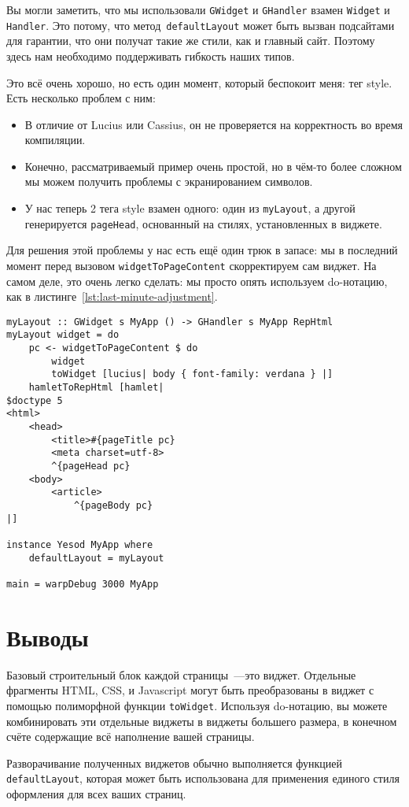 \begin{remark}
    Вы могли заметить, что мы использовали \lstinline'GWidget' и
    \lstinline'GHandler' взамен \lstinline'Widget' и \lstinline'Handler'. Это
    потому, что метод~\lstinline'defaultLayout' может быть вызван подсайтами
    для гарантии, что они получат такие же стили, как и главный сайт. Поэтому
    здесь нам необходимо поддерживать гибкость наших типов.
\end{remark}

Это всё очень хорошо, но есть один момент, который беспокоит меня: тег style.
Есть несколько проблем с ним:
\begin{itemize}
    \item В отличие от Lucius или Cassius, он не проверяется на корректность во
        время компиляции.

    \item Конечно, рассматриваемый пример очень простой, но в чём-то более
        сложном мы можем получить проблемы с экранированием символов.

    \item У нас теперь 2 тега style взамен одного: один из
        \lstinline'myLayout', а другой генерируется \lstinline'pageHead',
        основанный на стилях, установленных в виджете.
\end{itemize}

Для решения этой проблемы у нас есть ещё один трюк в запасе: мы в последний
момент перед вызовом \lstinline'widgetToPageContent' скорректируем сам виджет.
На самом деле, это очень легко сделать: мы просто опять используем do-нотацию,
как в листинге~\ref{lst:last-minute-adjustment}.
\begin{lstlisting}[caption={Корректировка виджета <<в последний момент>>},label={lst:last-minute-adjustment}]
myLayout :: GWidget s MyApp () -> GHandler s MyApp RepHtml
myLayout widget = do
    pc <- widgetToPageContent $ do
        widget
        toWidget [lucius| body { font-family: verdana } |]
    hamletToRepHtml [hamlet|
$doctype 5
<html>
    <head>
        <title>#{pageTitle pc}
        <meta charset=utf-8>
        ^{pageHead pc}
    <body>
        <article>
            ^{pageBody pc}
|]

instance Yesod MyApp where
    defaultLayout = myLayout

main = warpDebug 3000 MyApp
\end{lstlisting}

\section{Выводы}
Базовый строительный блок каждой страницы~---это виджет. Отдельные фрагменты
HTML, CSS, и Javascript могут быть преобразованы в виджет с помощью полиморфной
функции \lstinline'toWidget'. Используя do-нотацию, вы можете комбинировать эти
отдельные виджеты в виджеты большего размера, в конечном счёте содержащие всё
наполнение вашей страницы.

Разворачивание полученных виджетов обычно выполняется функцией
\lstinline'defaultLayout', которая может быть использована для применения
единого стиля оформления для всех ваших страниц.
